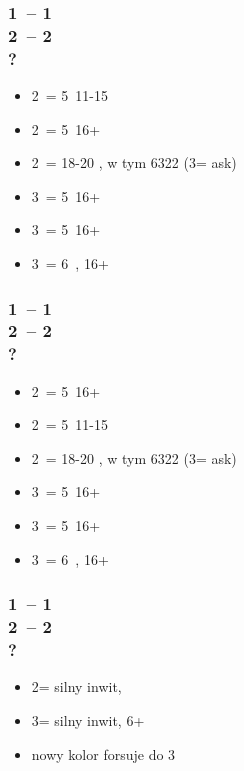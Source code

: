 \documentclass[12pt, a4paper]{article}
\begin{document}
\subsubsection*{1\hearts\ -- 1\ntx\ \\ 2\clubs\ -- 2\diams \\ ?}
\begin{itemize}
    \item 2\hearts\ = 5\clubs\ 11-15
    \item 2\spades\ = 5\spades\ 16+
    \item 2\ntx\ = 18-20 \bal, w tym 6322 (3\clubs = ask)
    \item 3\clubs\ = 5\clubs\ 16+
    \item 3\diams\ = 5\diams\ 16+
    \item 3\hearts\ = 6\hearts\ \unbal, 16+
\end{itemize}

\subsubsection*{1\spades\ -- 1\ntx\ \\ 2\clubs\ -- 2\diams \\ ?}
\begin{itemize}
    \item 2\hearts\ = 5\hearts\ 16+
    \item 2\spades\ = 5\clubs\ 11-15
    \item 2\ntx\ = 18-20 \bal, w tym 6322 (3\clubs = ask)
    \item 3\clubs\ = 5\clubs\ 16+
    \item 3\diams\ = 5\diams\ 16+
    \item 3\spades\ = 6\spades\ \unbal, 16+
\end{itemize}

\subsubsection*{1\major\ -- 1\ntx\ \\ 
                2\clubs\ -- 2\major \\ ?}
\begin{itemize}
    \item 2\nt = silny inwit, \nf
    \item 3\major = silny inwit, 6+
    \item nowy kolor forsuje do 3\major
\end{itemize}
\end{document}

